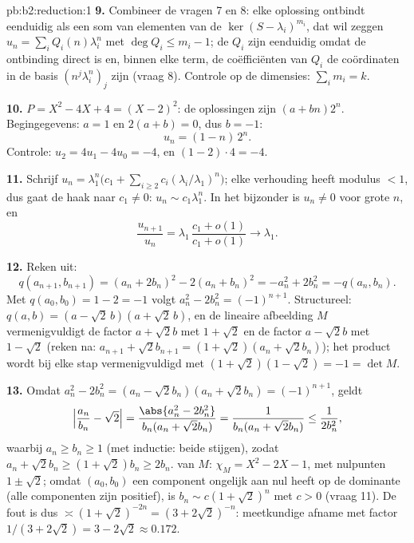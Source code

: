\begin{solution}{pb:b2:reduction:1}
\textbf{9.} Combineer de vragen 7 en 8: elke oplossing ontbindt
eenduidig als een som van elementen van de $\ker(S -
\lambda_i)^{m_i}$, dat wil zeggen $u_n = \sum_i
Q_i(n)\lambda_i^n$ met $\deg Q_i \leq m_i - 1$; de $Q_i$ zijn
eenduidig omdat de ontbinding direct is en, binnen elke term, de
coëfficiënten van $Q_i$ de coördinaten in de basis
$(n^j\lambda_i^n)_j$ zijn (vraag 8). Controle op de dimensies:
$\sum_i m_i = k$.

\textbf{10.} $P = X^2 - 4X + 4 = (X - 2)^2$: de oplossingen zijn
$(a + bn)2^n$. Begingegevens: $a = 1$ en $2(a + b) = 0$, dus $b =
-1$:
\[
u_n = (1 - n)\,2^n .
\]
Controle: $u_2 = 4u_1 - 4u_0 = -4$, en $(1 - 2)\cdot4 = -4$.

\textbf{11.} Schrijf $u_n = \lambda_1^n\bigl(c_1 + \sum_{i\geq2}
c_i(\lambda_i/\lambda_1)^n\bigr)$; elke verhouding heeft modulus $<
1$, dus gaat de haak naar $c_1 \neq 0$: $u_n \sim c_1\lambda_1^n$.
In het bijzonder is $u_n \neq 0$ voor grote $n$, en
\[
\frac{u_{n+1}}{u_n} =
\lambda_1\,\frac{c_1 + o(1)}{c_1 + o(1)} \longrightarrow
\lambda_1 .
\]

\textbf{12.} Reken uit:
\[
q(a_{n+1}, b_{n+1}) = (a_n + 2b_n)^2 - 2(a_n + b_n)^2
= -a_n^2 + 2b_n^2 = -q(a_n, b_n).
\]
Met $q(a_0, b_0) = 1 - 2 = -1$ volgt $a_n^2 - 2b_n^2 =
(-1)^{n+1}$. Structureel: $q(a, b) = (a - \sqrt2\,b)(a +
\sqrt2\,b)$, en de lineaire afbeelding $M$ vermenigvuldigt de
factor $a + \sqrt2 b$ met $1 + \sqrt2$ en de factor $a - \sqrt2 b$
met $1 - \sqrt2$ (reken na: $a_{n+1} + \sqrt2 b_{n+1} = (1 +
\sqrt2)(a_n + \sqrt2 b_n)$); het product wordt bij elke stap
vermenigvuldigd met $(1 + \sqrt2)(1 - \sqrt2) = -1 = \det M$.

\textbf{13.} Omdat $a_n^2 - 2b_n^2 = (a_n - \sqrt2 b_n)(a_n +
\sqrt2 b_n) = (-1)^{n+1}$, geldt
\[
\Bigl|\frac{a_n}{b_n} - \sqrt2\Bigr|
= \frac{\abs{a_n^2 - 2b_n^2}}{b_n(a_n + \sqrt2 b_n)}
= \frac{1}{b_n(a_n + \sqrt2 b_n)} \leq \frac1{2b_n^2},
\]
waarbij $a_n \geq b_n \geq 1$ (met inductie: beide stijgen), zodat
$a_n + \sqrt2 b_n \geq (1 + \sqrt2)b_n \geq 2b_n$.  van
$M$: $\chi_M = X^2 - 2X - 1$, met nulpunten $1 \pm \sqrt2$; omdat
$(a_0, b_0)$ een component ongelijk aan nul heeft op de dominante
 (alle componenten zijn positief), is $b_n \sim c(1 +
\sqrt2)^n$ met $c > 0$ (vraag 11). De fout is dus $\asymp (1 +
\sqrt2)^{-2n} = (3 + 2\sqrt2)^{-n}$: meetkundige afname met factor
$1/(3 + 2\sqrt2) = 3 - 2\sqrt2 \approx 0.172$.


\end{solution}
